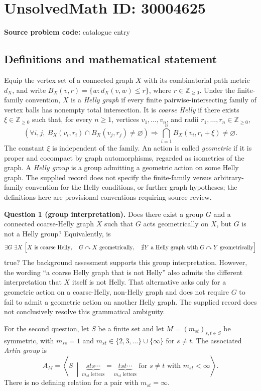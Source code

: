 \documentclass[11pt]{article}
\newcommand{\Z}{\mathbb{Z}}
\begin{document}
\section*{UnsolvedMath ID: 30004625}
\textbf{Source problem code:} catalogue entry
\subsection{Definitions and mathematical statement}
Equip the vertex set of a connected graph \(X\) with its combinatorial path metric \(d_X\), and write \(B_X(v,r)=\{w:d_X(v,w)\le r\}\), where \(r\in\Z_{\ge0}\). Under the finite-family convention, \(X\) is a \emph{Helly graph} if every finite pairwise-intersecting family of vertex balls has nonempty total intersection. It is \emph{coarse Helly} if there exists \(\xi\in\Z_{\ge0}\) such that, for every \(n\ge1\), vertices \(v_1,\ldots,v_n\), and radii \(r_1,\ldots,r_n\in\Z_{\ge0}\),
\[
\left(\forall i,j,\ B_X(v_i,r_i)\cap B_X(v_j,r_j)\ne\varnothing\right)
\Longrightarrow
\bigcap_{i=1}^{n}B_X(v_i,r_i+\xi)\ne\varnothing.
\]
The constant \(\xi\) is independent of the family. An action is called \emph{geometric} if it is proper and cocompact by graph automorphisms, regarded as isometries of the graph. A \emph{Helly group} is a group admitting a geometric action on some Helly graph. The supplied record does not specify the finite-family versus arbitrary-family convention for the Helly conditions, or further graph hypotheses; the definitions here are provisional conventions requiring source review.

\textbf{Question 1 (group interpretation).} Does there exist a group \(G\) and a connected coarse-Helly graph \(X\) such that \(G\) acts geometrically on \(X\), but \(G\) is not a Helly group? Equivalently, is
\[
\exists G\ \exists X\ \Bigl[
X\text{ is coarse Helly},\quad G\curvearrowright X\text{ geometrically},\quad
\nexists Y\text{ a Helly graph with }G\curvearrowright Y\text{ geometrically}
\Bigr]
\]
true? The background assessment supports this group interpretation. However, the wording ``a coarse Helly graph that is not Helly'' also admits the different interpretation that \(X\) itself is not Helly. That alternative asks only for a geometric action on a coarse-Helly, non-Helly graph and does not require \(G\) to fail to admit a geometric action on another Helly graph. The supplied record does not conclusively resolve this grammatical ambiguity.

For the second question, let \(S\) be a finite set and let \(M=(m_{st})_{s,t\in S}\) be symmetric, with \(m_{ss}=1\) and \(m_{st}\in\{2,3,\ldots\}\cup\{\infty\}\) for \(s\ne t\). The associated \emph{Artin group} is
\[
A_M=\left\langle S\ \middle|\ 
\underbrace{sts\cdots}_{m_{st}\text{ letters}}
=
\underbrace{tst\cdots}_{m_{st}\text{ letters}}
\text{ for }s\ne t\text{ with }m_{st}<\infty
\right\rangle.
\]
There is no defining relation for a pair with \(m_{st}=\infty\).
\end{document}
